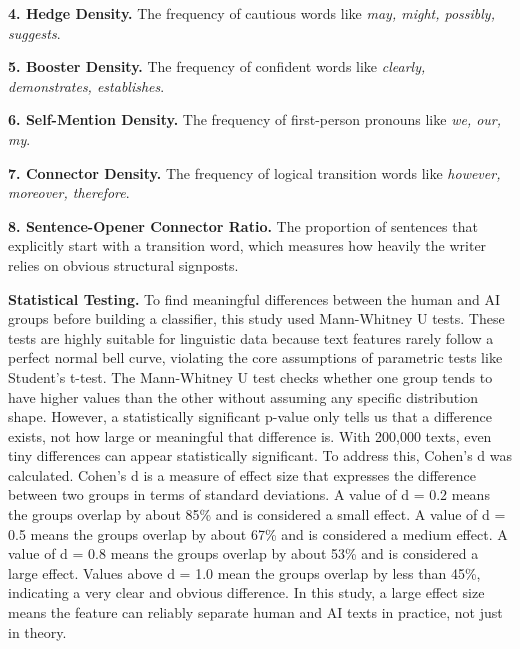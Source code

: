 \documentclass{article}
\begin{document}
\vspace{-3pt}
\textbf{4. Hedge Density.} The frequency of cautious words like \textit{may, might, possibly, suggests}.

\vspace{-3pt}
\textbf{5. Booster Density.} The frequency of confident words like \textit{clearly, demonstrates, establishes}.

\vspace{-3pt}
\textbf{6. Self-Mention Density.} The frequency of first-person pronouns like \textit{we, our, my}.

\vspace{-3pt}
\textbf{7. Connector Density.} The frequency of logical transition words like \textit{however, moreover, therefore}.

\vspace{-3pt}
\textbf{8. Sentence-Opener Connector Ratio.} The proportion of sentences that explicitly start with a transition word, which measures how heavily the writer relies on obvious structural signposts.

\textbf{Statistical Testing.} To find meaningful differences between the human and AI groups before building a classifier, this study used Mann-Whitney U tests. These tests are highly suitable for linguistic data because text features rarely follow a perfect normal bell curve, violating the core assumptions of parametric tests like Student's t-test. The Mann-Whitney U test checks whether one group tends to have higher values than the other without assuming any specific distribution shape. However, a statistically significant p-value only tells us that a difference exists, not how large or meaningful that difference is. With 200,000 texts, even tiny differences can appear statistically significant. To address this, Cohen's d was calculated. Cohen's d is a measure of effect size that expresses the difference between two groups in terms of standard deviations. A value of d = 0.2 means the groups overlap by about 85\% and is considered a small effect. A value of d = 0.5 means the groups overlap by about 67\% and is considered a medium effect. A value of d = 0.8 means the groups overlap by about 53\% and is considered a large effect. Values above d = 1.0 mean the groups overlap by less than 45\%, indicating a very clear and obvious difference. In this study, a large effect size means the feature can reliably separate human and AI texts in practice, not just in theory.
\end{document}
